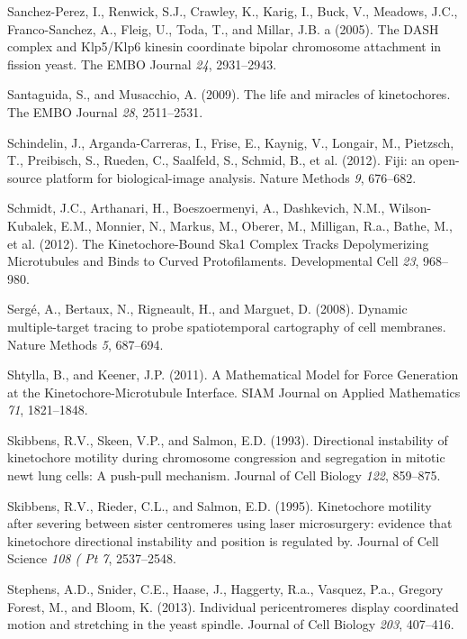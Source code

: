 \documentclass[12pt,a4paper,twoside,openright]{book}
\begin{document}
\hypertarget{ref-Sanchez-Perez2005}{}
Sanchez-Perez, I., Renwick, S.J., Crawley, K., Karig, I., Buck, V.,
Meadows, J.C., Franco-Sanchez, A., Fleig, U., Toda, T., and Millar, J.B.
a (2005). The DASH complex and Klp5/Klp6 kinesin coordinate bipolar
chromosome attachment in fission yeast. The EMBO Journal \emph{24},
2931--2943.

\hypertarget{ref-Santaguida2009a}{}
Santaguida, S., and Musacchio, A. (2009). The life and miracles of
kinetochores. The EMBO Journal \emph{28}, 2511--2531.

\hypertarget{ref-Schindelin2012}{}
Schindelin, J., Arganda-Carreras, I., Frise, E., Kaynig, V., Longair,
M., Pietzsch, T., Preibisch, S., Rueden, C., Saalfeld, S., Schmid, B.,
et al. (2012). Fiji: an open-source platform for biological-image
analysis. Nature Methods \emph{9}, 676--682.

\hypertarget{ref-Schmidt2012}{}
Schmidt, J.C., Arthanari, H., Boeszoermenyi, A., Dashkevich, N.M.,
Wilson-Kubalek, E.M., Monnier, N., Markus, M., Oberer, M., Milligan,
R.a., Bathe, M., et al. (2012). The Kinetochore-Bound Ska1 Complex
Tracks Depolymerizing Microtubules and Binds to Curved Protofilaments.
Developmental Cell \emph{23}, 968--980.

\hypertarget{ref-Serge2008}{}
Sergé, A., Bertaux, N., Rigneault, H., and Marguet, D. (2008). Dynamic
multiple-target tracing to probe spatiotemporal cartography of cell
membranes. Nature Methods \emph{5}, 687--694.

\hypertarget{ref-Shtylla2011}{}
Shtylla, B., and Keener, J.P. (2011). A Mathematical Model for Force
Generation at the Kinetochore-Microtubule Interface. SIAM Journal on
Applied Mathematics \emph{71}, 1821--1848.

\hypertarget{ref-Skibbens1993}{}
Skibbens, R.V., Skeen, V.P., and Salmon, E.D. (1993). Directional
instability of kinetochore motility during chromosome congression and
segregation in mitotic newt lung cells: A push-pull mechanism. Journal
of Cell Biology \emph{122}, 859--875.

\hypertarget{ref-Skibbens1995}{}
Skibbens, R.V., Rieder, C.L., and Salmon, E.D. (1995). Kinetochore
motility after severing between sister centromeres using laser
microsurgery: evidence that kinetochore directional instability and
position is regulated by. Journal of Cell Science \emph{108 ( Pt 7},
2537--2548.

\hypertarget{ref-Stephens2013a}{}
Stephens, A.D., Snider, C.E., Haase, J., Haggerty, R.a., Vasquez, P.a.,
Gregory Forest, M., and Bloom, K. (2013). Individual pericentromeres
display coordinated motion and stretching in the yeast spindle. Journal
of Cell Biology \emph{203}, 407--416.
\end{document}
